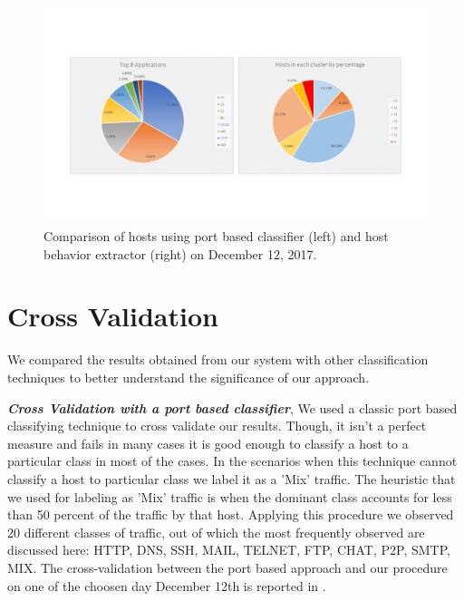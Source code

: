 \begin{figure}[t]
	\centerline{\includegraphics[trim=2cm 2cm 2cm 2cm, scale = 0.5]{dec12-port-behaviors.pdf}}
	\caption{Comparison of hosts using port based classifier (left) and host behavior extractor (right) on December 12, 2017.}%
\end{figure}


\section{Cross Validation} \label{cross_validation}
We compared the results obtained from our system with other classification techniques to better understand the significance of our approach.

\textbf{\textit{Cross Validation with a port based classifier}}, We used a classic port based classifying technique to cross validate our results. Though, it isn't a perfect measure and fails in many cases it is good enough to classify a host to a particular class in most of the cases.
In the scenarios when this technique cannot classify a host to particular class we label it as a 'Mix' traffic. The heuristic that we used for labeling as 'Mix' traffic is when the dominant class accounts for less than 50 percent of the traffic by that host. Applying this procedure we observed 20 different classes of traffic, out of which the most frequently observed are discussed here: HTTP, DNS, SSH, MAIL, TELNET, FTP, CHAT, P2P, SMTP, MIX. The cross-validation between the port based approach and  our procedure on one of the choosen day December 12th is reported in . 

